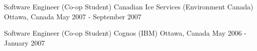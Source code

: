 \begin{cventries}

\cventry
{Software Engineer (Co-op Student)} %
{Canadian Ice Services (Environment Canada)} %
{Ottawa, Canada} %
{May 2007 - September 2007} %
{ %
\begin{cvitems}
\item {}
\end{cvitems}
}


\cventry
{Software Engineer (Co-op Student)} %
{Cognos (IBM)} %
{Ottawa, Canada} %
{May 2006 - January 2007} %
{ %
\begin{cvitems}
\item {}
\end{cvitems}
}


\end{cventries}